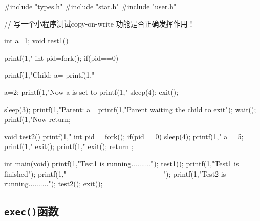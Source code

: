 \documentclass{swfuthesism}
\begin{document}
\begin{ccode}
#include "types.h"
#include "stat.h"
#include "user.h"

// 写一个小程序测试copy-on-write 功能是否正确发挥作用！

int a=1;
void test1()
{
  printf(1,"%
  int pid=fork();
  if(pid==0)
  {
    printf(1,"Child: a=%
    printf(1,"%

    a=2;
    printf(1,"Now a is set to %
    printf(1,"%
    sleep(4);
    exit();
  }
  sleep(3);
  printf(1,"Parent: a=%
  printf(1,"Parent waiting the child to exit\n");
  wait();
  printf(1,"Now %
  return;
}

void test2()
{
    printf(1,"%
    int pid = fork();
    if(pid==0)
    {
        sleep(4);
        printf(1,"%
        a = 5;
        printf(1,"%
        exit();
    }
    printf(1,"%
    exit();
    return ;
}


int main(void)
{
  printf(1,"Test1 is running..........\n");
  test1();
  printf(1,"Test1 is finished\n");
  printf(1,"-----------------------------------------\n");
  printf(1,"Test2 is running..........\n");
  test2();
  exit();
}
\end{ccode}

\subsection{\texttt{exec()}函数}
\label{sec:exec}
\end{document}
